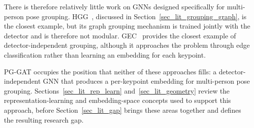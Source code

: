 There is therefore relatively little work on GNNs designed specifically for multi-person pose grouping.
HGG~\cite{jin2020hgg}, discussed in Section~\ref{sec_lit_grouping_graph}, is the closest example,
but its graph grouping mechanism is trained jointly with the detector and is therefore not modular.
GEC~\cite{maher2025gec} provides the closest example of detector-independent grouping,
although it approaches the problem through edge classification
rather than learning an embedding for each keypoint.

PG-GAT occupies the position that neither of these approaches fills:
a detector-independent GNN that produces a per-keypoint embedding for multi-person pose grouping.
Sections~\ref{sec_lit_rep_learn} and~\ref{sec_lit_geometry}
review the representation-learning and embedding-space concepts used to support this approach,
before Section~\ref{sec_lit_gap} brings these areas together and defines the resulting research gap.